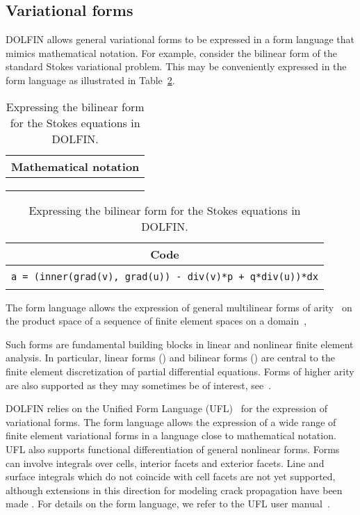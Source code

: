 \documentclass[acmtoms]{acmtrans2m}
\newcommand{\dolfin}{DOLFIN}
\newcommand{\codeonly}[1]{\begin{center}
  \begin{tabular}{|c|}
    \hline
    Code \\
    \hline
    \hspace{10cm} \\
    \texttt{#1} \\
    \\
    \hline
  \end{tabular}
\end{center}}
\newcommand{\mathonly}[1]{\begin{center}
  \begin{tabular}{|c|}
    \hline
    Mathematical notation \\
    \hline
    \hspace{10cm} \\
    \texttt{#1} \\
    \\
    \hline
  \end{tabular}
\end{center}}
\begin{document}
\subsection{Variational forms}

\dolfin{} allows general variational forms to be expressed in a form
language that mimics mathematical notation. For example, consider
the bilinear form of the standard Stokes variational problem. This
may be conveniently expressed in the form language as illustrated in
Table~\ref{tab:codevsmath}.
\begin{table}
  \mathonly{}
  \codeonly{a = (inner(grad(v), grad(u)) - div(v)*p + q*div(u))*dx}
  \caption{Expressing the bilinear form for the Stokes equations in \dolfin{}.}
  \label{tab:codevsmath}
\end{table}
The form language allows the expression of general multilinear forms
of arity~ on the product space  of a sequence  of finite
element spaces on a domain~,

Such forms are fundamental building blocks in linear and nonlinear
finite element analysis. In particular, linear forms () and
bilinear forms () are central to the finite element
discretization of partial differential equations. Forms of higher
arity are also supported as they may sometimes be of interest,
see~.

\dolfin{} relies on the Unified Form Language
(UFL)~\cite{www:UFL,Alnaes2009} for the expression of variational forms.
The form language allows the expression of a wide range of finite
element variational forms in a language close to mathematical
notation. UFL also supports functional differentiation of general
nonlinear forms. Forms can involve integrals over cells, interior
facets and exterior facets. Line and surface integrals which do not
coincide with cell facets are not yet supported, although extensions
in this direction for modeling crack propagation have been made
\cite{nikbakht:2009}. For details on the form language, we refer to
the UFL user manual~\cite{www:UFL}.
\end{document}
